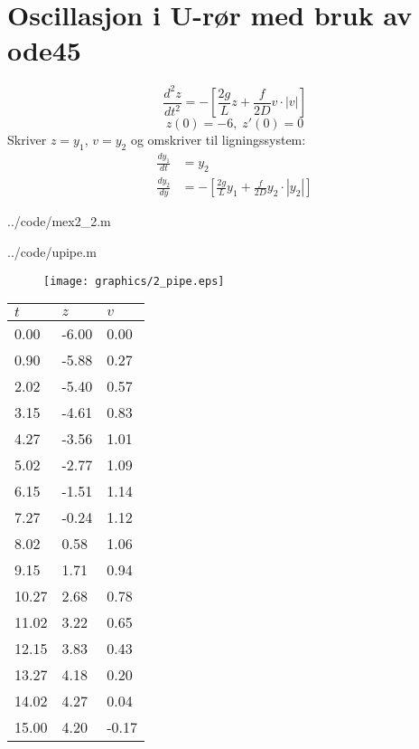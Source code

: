 \section{Oscillasjon i U-rør med bruk av ode45} %
\label{sec:oscillasjon_i_u_r_r_med_bruk_av_ode45}
\begin{equation}
  \frac{d^2z}{dt^2} = - \left[ \frac{2g}{L}z + \frac{f}{2D}v\cdot|v| \right]
  \label{eq:uror}
\end{equation}
\begin{equation}
  z(0) = -6,\; z'(0) = 0
\end{equation}
Skriver $z = y_1$, $v = y_2$ og omskriver til ligningssystem:
\begin{align}
  \frac{dy_1}{dt} &= y_2 \label{eq:syst1} \\
  \frac{dy_2}{dy} &= -\left[ \frac{2g}{L}y_1+\frac{f}{2D}y_2\cdot|y_2| \right] \label{eq:syst2}
\end{align}


  {../code/mex2_2.m}


  {../code/upipe.m}

\begin{figure}[H]
  \centering
  \texttt{[image: graphics/2\_pipe.eps]}
  \label{fig:pipe}
\end{figure}

\begin{table}[H]
\centering
\begin{tabularx}{0.5\textwidth}{XXX}
\toprule
$t$  & $z$  & $v$ \\
\midrule
  0.00 & -6.00 & 0.00 \\
  0.90 & -5.88 & 0.27 \\
  2.02 & -5.40 & 0.57 \\
  3.15 & -4.61 & 0.83 \\
  4.27 & -3.56 & 1.01 \\
  5.02 & -2.77 & 1.09 \\
  6.15 & -1.51 & 1.14 \\
  7.27 & -0.24 & 1.12 \\
  8.02 &  0.58 & 1.06 \\
  9.15 &  1.71 & 0.94 \\
 10.27 &  2.68 & 0.78 \\
 11.02 &  3.22 & 0.65 \\
 12.15 &  3.83 & 0.43 \\
 13.27 &  4.18 & 0.20 \\
 14.02 &  4.27 & 0.04 \\
 15.00 &  4.20 &-0.17 \\
\bottomrule
\end{tabularx}
\end{table}



